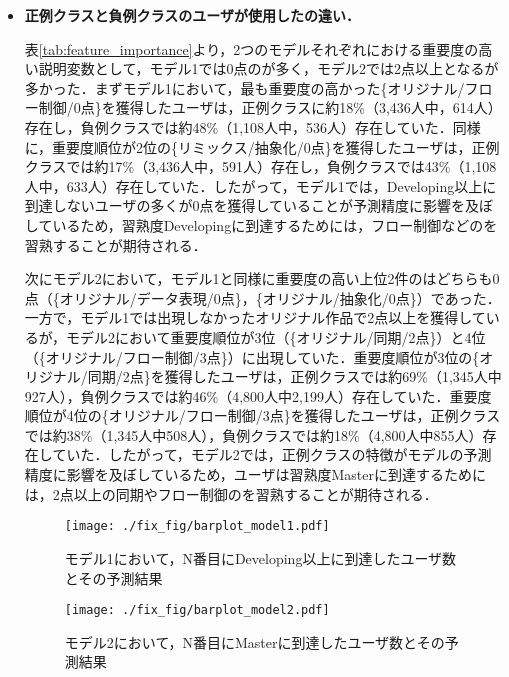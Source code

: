 \documentclass[submit]{ipsj}
\begin{document}
\begin{itemize}

\item \textbf{正例クラスと負例クラスのユーザが使用した\textcolor{red}{}の違い．}

表\ref{tab:feature_importance}より，2つのモデルそれぞれにおける重要度の高い説明変数として，モデル1では0点の\textcolor{red}{}が多く，モデル2では2点以上となる\textcolor{red}{}が多かった．まずモデル1において，最も重要度の高かった\{オリジナル/フロー制御/0点\}を獲得したユーザは，正例クラスに約18\%（3,436人中，614人）存在し，負例クラスでは約48\%（1,108人中，536人）存在していた．同様に，重要度順位が2位の\{リミックス/抽象化/0点\}を獲得したユーザは，正例クラスでは約17\%（3,436人中，591人）存在し，負例クラスでは43\%（1,108人中，633人）存在していた．したがって，モデル1では，Developing以上に到達しないユーザの多くが0点を獲得していることが予測精度に影響を及ぼしているため，習熟度Developingに到達するためには，フロー制御などの\textcolor{red}{}を習熟することが期待される．

次にモデル2において，モデル1と同様に重要度の高い上位2件の\textcolor{red}{}はどちらも0点（\{オリジナル/データ表現/0点\}，\{オリジナル/抽象化/0点\}）であった．一方で，モデル1では出現しなかったオリジナル作品で2点以上を獲得している\textcolor{red}{}が，モデル2において重要度順位が3位（\{オリジナル/同期/2点\}）と4位（\{オリジナル/フロー制御/3点\}）に出現していた．重要度順位が3位の\{オリジナル/同期/2点\}を獲得したユーザは，正例クラスでは約69\%（1,345人中927人），負例クラスでは約46\%（4,800人中2,199人）存在していた．重要度順位が4位の\{オリジナル/フロー制御/3点\}を獲得したユーザは，正例クラスでは約38\%（1,345人中508人），負例クラスでは約18\%（4,800人中855人）存在していた．したがって，モデル2では，正例クラスの特徴がモデルの予測精度に影響を及ぼしているため，ユーザは習熟度Masterに到達するためには，2点以上の同期やフロー制御の\textcolor{red}{}を習熟することが期待される．

\begin{figure}[t]
    \centering
    \texttt{[image: ./fix\_fig/barplot\_model1.pdf]}
    \caption{モデル1において，N番目にDeveloping以上に到達したユーザ数とその予測結果}
    \label{fig:barplot_model1}
\end{figure}

\begin{figure}[t]
    \centering
    \texttt{[image: ./fix\_fig/barplot\_model2.pdf]}
    \caption{モデル2において，N番目にMasterに到達したユーザ数とその予測結果}
    \label{fig:barplot_model2}
\end{figure}


\end{itemize}
\end{document}
